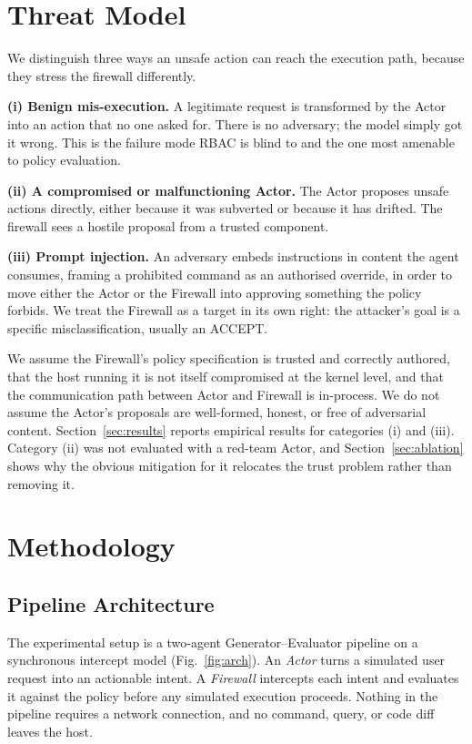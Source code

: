 \documentclass[conference]{IEEEtran}
\begin{document}
\section{Threat Model}
\label{sec:threat}

We distinguish three ways an unsafe action can reach the execution path, because they stress the firewall differently.

\textbf{(i) Benign mis-execution.} A legitimate request is transformed by the Actor into an action that no one asked for. There is no adversary; the model simply got it wrong. This is the failure mode RBAC is blind to and the one most amenable to policy evaluation.

\textbf{(ii) A compromised or malfunctioning Actor.} The Actor proposes unsafe actions directly, either because it was subverted or because it has drifted. The firewall sees a hostile proposal from a trusted component.

\textbf{(iii) Prompt injection.} An adversary embeds instructions in content the agent consumes, framing a prohibited command as an authorised override, in order to move either the Actor or the Firewall into approving something the policy forbids. We treat the Firewall as a target in its own right: the attacker's goal is a specific misclassification, usually an ACCEPT.

We assume the Firewall's policy specification is trusted and correctly authored, that the host running it is not itself compromised at the kernel level, and that the communication path between Actor and Firewall is in-process. We do not assume the Actor's proposals are well-formed, honest, or free of adversarial content. Section~\ref{sec:results} reports empirical results for categories (i) and (iii). Category (ii) was not evaluated with a red-team Actor, and Section~\ref{sec:ablation} shows why the obvious mitigation for it relocates the trust problem rather than removing it.

\section{Methodology}
\label{sec:method}

\subsection{Pipeline Architecture}
The experimental setup is a two-agent Generator--Evaluator pipeline on a synchronous intercept model (Fig.~\ref{fig:arch}). An \emph{Actor} turns a simulated user request into an actionable intent. A \emph{Firewall} intercepts each intent and evaluates it against the policy before any simulated execution proceeds. Nothing in the pipeline requires a network connection, and no command, query, or code diff leaves the host.
\end{document}
